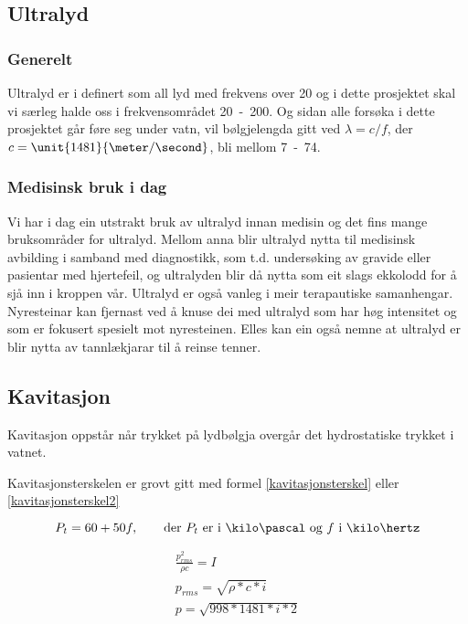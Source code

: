 \subsection{Ultralyd}
\subsubsection*{Generelt}
Ultralyd er i \cite[s. 443]{citeulike:4412590} definert som all lyd med frekvens over \unit{20}{\kilo \hertz} og i dette prosjektet skal vi særleg halde oss i frekvensområdet \unit{20 - 200}{\kilo \hertz}. Og sidan alle forsøka i dette prosjektet går føre seg under vatn, vil bølgjelengda gitt ved $\lambda = c / f$, der $c = \unit{1481}{\meter / \second}$, bli mellom \unit{7 - 74}{\milli\meter}.

\subsubsection*{Medisinsk bruk i dag}
Vi har i dag ein utstrakt bruk av ultralyd innan medisin og det fins mange bruksområder for ultralyd. Mellom anna blir ultralyd nytta til medisinsk avbilding i samband med diagnostikk, som t.d. undersøking av gravide eller pasientar med hjertefeil, og ultralyden blir då nytta som eit slags ekkolodd for å sjå inn i kroppen vår. Ultralyd er også vanleg i meir terapautiske samanhengar. Nyresteinar kan fjernast ved å knuse dei med ultralyd som har høg intensitet og som er fokusert spesielt mot nyresteinen. Elles kan ein også nemne at ultralyd er blir nytta av tannlækjarar til å reinse tenner.

\subsection{Kavitasjon}
Kavitasjon oppstår når trykket på lydbølgja overgår det hydrostatiske trykket i vatnet.\cite{Kinsler:2000rc}

Kavitasjonsterskelen er grovt gitt\cite{kavitasjon} med formel \eqref{kavitasjonsterskel} eller \eqref{kavitasjonsterskel2}

\begin{equation}
\label{kavitasjonsterskel}
P_t = 60 + 50f, \qquad \text{der } P_t \text{ er i } \kilo\pascal \text{ og } f \text{ i } \kilo\hertz
\end{equation}

\begin{eqnarray}
	\label{kavitasjonsterskel2}
	\frac{p^2_{rms}}{\rho c} = I \\
	p_{rms} = \sqrt{\rho* c * i} \\
	p = \sqrt{998* 1481 * i * 2} 
\end{eqnarray}


